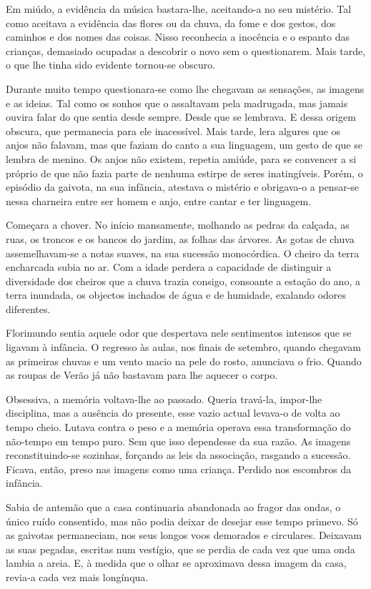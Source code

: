 Em miúdo, a evidência da música bastara-lhe, aceitando-a no seu
mistério. Tal como aceitava a evidência das flores ou da chuva, da fome
e dos gestos, dos caminhos e dos nomes das coisas. Nisso reconhecia a
inocência e o espanto das crianças, demasiado ocupadas a descobrir o
novo sem o questionarem. Mais tarde, o que lhe tinha sido evidente
tornou-se obscuro.

Durante muito tempo questionara-se como lhe chegavam as sensações, as
imagens e as ideias. Tal como os sonhos que o assaltavam pela madrugada,
mas jamais ouvira falar do que sentia desde sempre. Desde que se
lembrava. E dessa origem obscura, que permanecia para ele inacessível.
Mais tarde, lera algures que os anjos não falavam, mas que faziam do
canto a sua linguagem, um gesto de que se lembra de menino. Os anjos não
existem, repetia amiúde, para se convencer a si próprio de que não fazia
parte de nenhuma estirpe de seres inatingíveis. Porém, o episódio da
gaivota, na sua infância, atestava o mistério e obrigava-o a pensar-se
nessa charneira entre ser homem e anjo, entre cantar e ter linguagem.

Começara a chover. No início mansamente, molhando as pedras da calçada,
as ruas, os troncos e os bancos do jardim, as folhas das árvores. As
gotas de chuva assemelhavam-se a notas suaves, na sua sucessão
monocórdica. O cheiro da terra encharcada subia no ar. Com a idade
perdera a capacidade de distinguir a diversidade dos cheiros que a chuva
trazia consigo, consoante a estação do ano, a terra inundada, os
objectos inchados de água e de humidade, exalando odores diferentes.

Florimundo sentia aquele odor que despertava nele sentimentos intensos
que se ligavam à infância. O regresso às aulas, nos finais de setembro,
quando chegavam as primeiras chuvas e um vento macio na pele do rosto,
anunciava o frio. Quando as roupas de Verão já não bastavam para lhe
aquecer o corpo.

Obsessiva, a memória voltava-lhe ao passado. Queria travá-la, impor-lhe
disciplina, mas a ausência do presente, esse vazio actual levava-o de
volta ao tempo cheio. Lutava contra o peso e a memória operava essa
transformação do não-tempo em tempo puro. Sem que isso dependesse da sua
razão. As imagens reconstituindo-se sozinhas, forçando as leis da
associação, rasgando a sucessão. Ficava, então, preso nas imagens como
uma criança. Perdido nos escombros da infância.

Sabia de antemão que a casa continuaria abandonada ao fragor das ondas,
o único ruído consentido, mas não podia deixar de desejar esse tempo
primevo. Só as gaivotas permaneciam, nos seus longos voos demorados e
circulares. Deixavam as suas pegadas, escritas num vestígio, que se
perdia de cada vez que uma onda lambia a areia. E, à medida que o olhar
se aproximava dessa imagem da casa, revia-a cada vez mais longínqua.

